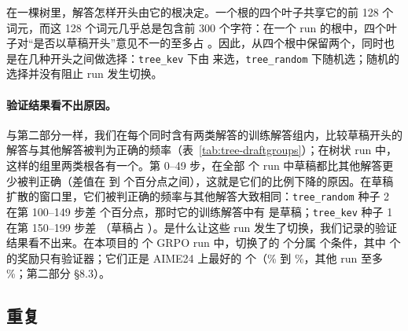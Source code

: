 在一棵树里，解答怎样开头由它的根决定。一个根的四个叶子共享它的前 128 个词元，而这 128 个词元几乎总是包含前 300 个字符：在一个 run 的根中，四个叶子对“是否以草稿开头”意见不一的至多占 。因此，从四个根中保留两个，同时也是在几种开头之间做选择：\texttt{tree\_kev} 下由 \kev{} 来选，\texttt{tree\_random} 下随机选；随机的选择并没有阻止 run 发生切换。

\begin{table}[t]
\centering\small

\caption{以非正式草稿开头（前 300 个字符中没有数学定界符、markdown 标题或粗体）的 MATH-500 解答所占比例：每次定期评估（贪心，每 50 步）和最终评估，逐个 run 列出，并附最终准确率。}
\label{tab:tree-drafts}
\end{table}

\paragraph{验证结果看不出原因。} 与第二部分一样，我们在每个同时含有两类解答的训练解答组内，比较草稿开头的解答与其他解答被判为正确的频率（表~\ref{tab:tree-draftgroups}）；在树状 run 中，这样的组里两类根各有一个。第 0--49 步，在全部  个 run 中草稿都比其他解答更少被判正确（差值在  到  个百分点之间），这就是它们的比例下降的原因。在草稿扩散的窗口里，它们被判正确的频率与其他解答大致相同：\texttt{tree\_random} 种子 2 在第 100--149 步差  个百分点，那时它的训练解答中有  是草稿；\texttt{tree\_kev} 种子 1 在第 150--199 步差 （草稿占 ）。是什么让这些 run 发生了切换，我们记录的验证结果看不出来。在本项目的  个 GRPO run 中，切换了的  个分属  个条件，其中  个的奖励只有验证器；它们正是 AIME24 上最好的  个（\% 到 \%，其他 run 至多 \%；第二部分 \S8.3）。

\begin{table}[t]
\centering\small

\caption{以非正式草稿开头的训练解答，按 50 步的窗口：它们所占比例，以及 $\Delta$ right：在同时含有两类解答的组上取平均的、草稿被验证器判为正确的比例减去同组其他解答的这一比例（百分点）。}
\label{tab:tree-draftgroups}
\end{table}

\subsection{重复}\label{sec:res-tree-repeat}

